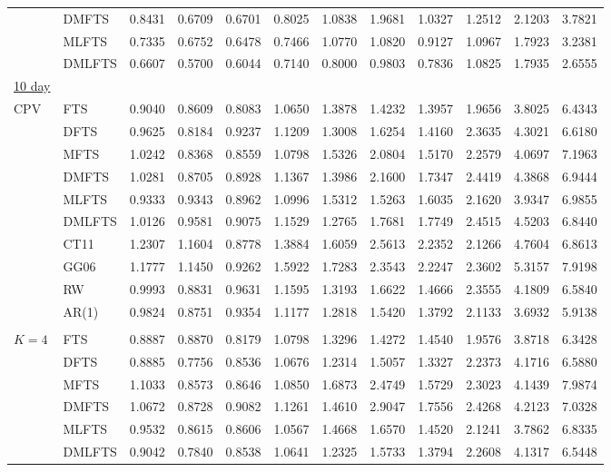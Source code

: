\documentclass[12pt,a4paper]{article}
\begin{document}
\begin{center}
\begin{small}
\begin{longtable}{@{}llrrrrrrrrrr@{}}
  & DMFTS & 0.8431 & 0.6709 & 0.6701 & 0.8025 & 1.0838 & 1.9681 & 1.0327 & 1.2512 & 2.1203 & 3.7821 \\ 
  & MLFTS & 0.7335 & 0.6752 & 0.6478 & 0.7466 & 1.0770 & 1.0820 & 0.9127 & 1.0967 & 1.7923 & 3.2381 \\ 
  & DMLFTS & 0.6607 & 0.5700 & 0.6044 & 0.7140 & 0.8000 & 0.9803 & 0.7836 & 1.0825 & 1.7935 & 2.6555 \\
\underline{10 day} \\
 CPV & FTS & 0.9040 & 0.8609 & 0.8083 & 1.0650 & 1.3878 & 1.4232 & 1.3957 & 1.9656 & 3.8025 & 6.4343 \\ 
&  DFTS & 0.9625 & 0.8184 & 0.9237 & 1.1209 & 1.3008 & 1.6254 & 1.4160 & 2.3635 & 4.3021 & 6.6180 \\ 
&  MFTS & 1.0242 & 0.8368 & 0.8559 & 1.0798 & 1.5326 & 2.0804 & 1.5170 & 2.2579 & 4.0697 & 7.1963 \\ 
 & DMFTS & 1.0281 & 0.8705 & 0.8928 & 1.1367 & 1.3986 & 2.1600 & 1.7347 & 2.4419 & 4.3868 & 6.9444 \\ 
 & MLFTS & 0.9333 & 0.9343 & 0.8962 & 1.0996 & 1.5312 & 1.5263 & 1.6035 & 2.1620 & 3.9347 & 6.9855 \\ 
&  DMLFTS & 1.0126 & 0.9581 & 0.9075 & 1.1529 & 1.2765 & 1.7681 & 1.7749 & 2.4515 & 4.5203 & 6.8440 \\ 
& CT11 & 1.2307 & 1.1604 & 0.8778 & 1.3884 & 1.6059 & 2.5613 & 2.2352 & 2.1266 & 4.7604 & 6.8613 \\ 
  & GG06 & 1.1777 & 1.1450 & 0.9262 & 1.5922 & 1.7283 & 2.3543 & 2.2247 & 2.3602 & 5.3157 & 7.9198 \\ 
  & RW & 0.9993 & 0.8831 & 0.9631 & 1.1595 & 1.3193 & 1.6622 & 1.4666 & 2.3555 & 4.1809 & 6.5840 \\ 
  & AR(1) & 0.9824 & 0.8751 & 0.9354 & 1.1177 & 1.2818 & 1.5420 & 1.3792 & 2.1133 & 3.6932 & 5.9138 \\ 
\\
 $K=4$ & FTS & 0.8887 & 0.8870 & 0.8179 & 1.0798 & 1.3296 & 1.4272 & 1.4540 & 1.9576 & 3.8718 & 6.3428 \\ 
&  DFTS & 0.8885 & 0.7756 & 0.8536 & 1.0676 & 1.2314 & 1.5057 & 1.3327 & 2.2373 & 4.1716 & 6.5880 \\ 
&  MFTS & 1.1033 & 0.8573 & 0.8646 & 1.0850 & 1.6873 & 2.4749 & 1.5729 & 2.3023 & 4.1439 & 7.9874 \\ 
&  DMFTS & 1.0672 & 0.8728 & 0.9082 & 1.1261 & 1.4610 & 2.9047 & 1.7556 & 2.4268 & 4.2123 & 7.0328 \\ 
&  MLFTS & 0.9532 & 0.8615 & 0.8606 & 1.0567 & 1.4668 & 1.6570 & 1.4520 & 2.1241 & 3.7862 & 6.8335 \\ 
&  DMLFTS & 0.9042 & 0.7840 & 0.8538 & 1.0641 & 1.2325 & 1.5733 & 1.3794 & 2.2608 & 4.1317 & 6.5448 \\
  \bottomrule
\end{longtable}
\end{small}
\end{center}
\end{document}
